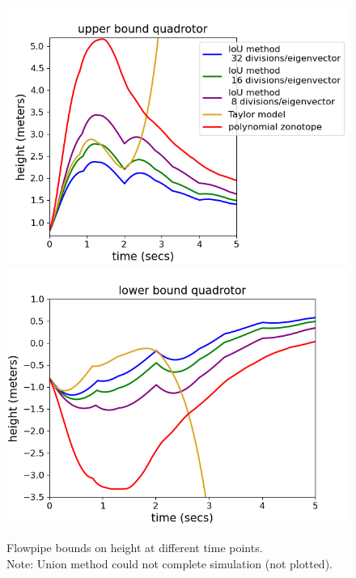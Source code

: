 \begin{figure}
\includegraphics[scale = 0.65]{quadrotorImages/ubToolHeight.png}\vspace{-0.4em}
\includegraphics[scale = 0.6]{quadrotorImages/lbToolHeight.png}
\caption{Flowpipe bounds on height at different time points.\\
Note: Union method could not complete simulation (not plotted).}\label{fig:flowquadrotor}
\end{figure}
